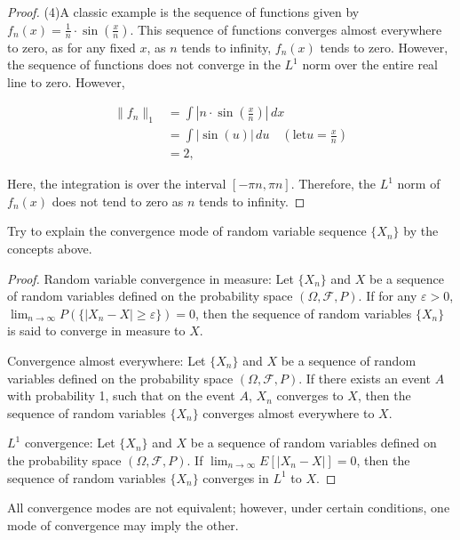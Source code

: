 \begin{proof}
    (4)A classic example is the sequence of functions given by
    $f_n(x) = \frac{1}{n} \cdot \sin\left(\frac{x}{n}\right)$.
    This sequence of functions converges almost everywhere to zero, 
    as for any fixed $x$, as $n$ tends to infinity, $f_n(x)$ tends to zero.
    However, the sequence of functions does not converge in the $L^1$ 
    norm over the entire real line to zero.
    However,

    $$
    \begin{aligned}
    \|f_n\|_1 &= \int |n \cdot \sin\left(\frac{x}{n}\right)| \, dx \\
    &= \int | \sin(u) | \, du \quad (\text{let} u = \frac{x}{n}) \\
    &= 2,
    \end{aligned}
    $$

    Here, the integration is over the interval $[- \pi n, \pi n]$. 
    Therefore, the $L^1$ norm of $f_n(x)$ does not tend to zero as $n$ 
    tends to infinity.
\end{proof}
\begin{exc}
    Try to explain the convergence mode of random variable 
    sequence $\{X_{n}\}$ by the concepts above.
\end{exc}
\begin{proof}
    Random variable convergence in measure: Let $\{X_n\}$ and 
    $X$ be a sequence of random variables defined on the 
    probability space $(\Omega, \mathcal{F}, P)$. If for any 
    $\varepsilon > 0$, $\lim_{n \to \infty} P(\{|X_n - X| \geq 
    \varepsilon\}) = 0$, then the sequence of random variables 
    $\{X_n\}$ is said to converge in measure to $X$.

    Convergence almost everywhere: Let $\{X_n\}$ and $X$ be a 
    sequence of random variables defined on the probability space 
    $(\Omega, \mathcal{F}, P)$. If there exists an event $A$ with 
    probability 1, such that on the event $A$, $X_n$ converges to 
    $X$, then the sequence of random variables $\{X_n\}$ converges 
    almost everywhere to $X$.

    $L^1$ convergence: Let $\{X_n\}$ and $X$ be a sequence of random 
    variables defined on the probability space $(\Omega, \mathcal{F}, P)$.
    If $\lim_{n \to \infty} E[|X_n - X|] = 0$, then the sequence of 
    random variables $\{X_n\}$ converges in $L^1$ to $X$.
\end{proof}
\begin{rem}
    All convergence modes are not equivalent; 
    however, under certain conditions, 
    one mode of convergence may imply the other.
\end{rem}
